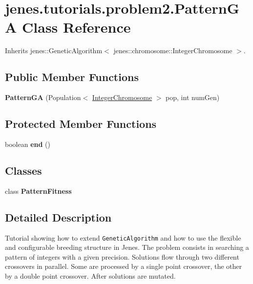 \hypertarget{classjenes_1_1tutorials_1_1problem2_1_1_pattern_g_a}{
\section{jenes.tutorials.problem2.PatternGA Class Reference}
\label{classjenes_1_1tutorials_1_1problem2_1_1_pattern_g_a}
}
Inherits jenes::GeneticAlgorithm$<$ jenes::chromosome::IntegerChromosome $>$.

\subsection*{Public Member Functions}
\begin{CompactItemize}
\item 
\hypertarget{classjenes_1_1tutorials_1_1problem2_1_1_pattern_g_a_009d1901fabdcabacb443297eb2295ce}{
\textbf{PatternGA} (Population$<$ \hyperlink{classjenes_1_1chromosome_1_1_integer_chromosome}{IntegerChromosome} $>$ pop, int numGen)}
\label{classjenes_1_1tutorials_1_1problem2_1_1_pattern_g_a_009d1901fabdcabacb443297eb2295ce}

\end{CompactItemize}
\subsection*{Protected Member Functions}
\begin{CompactItemize}
\item 
\hypertarget{classjenes_1_1tutorials_1_1problem2_1_1_pattern_g_a_3785b5c77bc9bfab62fd3ef7c6ea8fb9}{
boolean \textbf{end} ()}
\label{classjenes_1_1tutorials_1_1problem2_1_1_pattern_g_a_3785b5c77bc9bfab62fd3ef7c6ea8fb9}

\end{CompactItemize}
\subsection*{Classes}
\begin{CompactItemize}
\item 
class \textbf{PatternFitness}
\end{CompactItemize}


\subsection{Detailed Description}
Tutorial showing how to extend {\tt GeneticAlgorithm} and how to use the flexible and configurable breeding structure in Jenes. The problem consists in searching a pattern of integers with a given precision. Solutions flow through two different crossovers in parallel. Some are processed by a single point crossover, the other by a double point crossover. After solutions are mutated.

